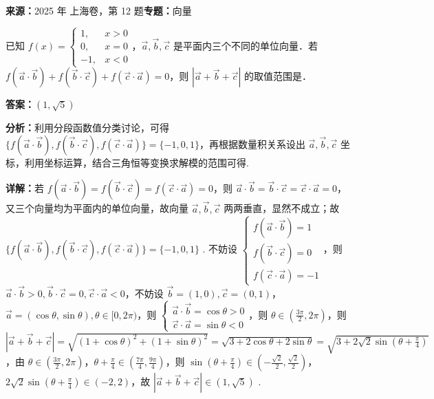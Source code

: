 \begin{question}[points=5]
\textbf{来源：}2025 年 上海卷，第 12 题\quad \textbf{专题：}向量\par
已知 $f(x) = \begin{cases} 1, & x > 0 \\ 0, & x = 0 \\ -1, & x < 0 \end{cases}$，$\vec{a}, \vec{b}, \vec{c}$ 是平面内三个不同的单位向量．若 $f(\vec{a} \cdot \vec{b}) + f(\vec{b} \cdot \vec{c}) + f(\vec{c} \cdot \vec{a}) = 0$，则 $|\vec{a} + \vec{b} + \vec{c}|$ 的取值范围是．
\fillin[{$(1, \sqrt{5})$}]
\begin{solution}
\textbf{答案：}$(1, \sqrt{5})$

\textbf{分析：}利用分段函数值分类讨论，可得 $\{f(\vec{a} \cdot \vec{b}), f(\vec{b} \cdot \vec{c}), f(\vec{c} \cdot \vec{a})\} = \{-1, 0, 1\}$，再根据数量积关系设出 $\vec{a}, \vec{b}, \vec{c}$ 坐标，利用坐标运算，结合三角恒等变换求解模的范围可得.

\textbf{详解：}若 $f(\vec{a} \cdot \vec{b}) = f(\vec{b} \cdot \vec{c}) = f(\vec{c} \cdot \vec{a}) = 0$，则 $\vec{a} \cdot \vec{b} = \vec{b} \cdot \vec{c} = \vec{c} \cdot \vec{a} = 0$，又三个向量均为平面内的单位向量，故向量 $\vec{a}, \vec{b}, \vec{c}$ 两两垂直，显然不成立；故 $\{f(\vec{a} \cdot \vec{b}), f(\vec{b} \cdot \vec{c}), f(\vec{c} \cdot \vec{a})\} = \{-1, 0, 1\}$ . 不妨设 $\begin{cases} f(\vec{a} \cdot \vec{b}) = 1 \\ f(\vec{b} \cdot \vec{c}) = 0 \\ f(\vec{c} \cdot \vec{a}) = -1 \end{cases}$，则 $\vec{a} \cdot \vec{b} > 0, \vec{b} \cdot \vec{c} = 0, \vec{c} \cdot \vec{a} < 0$，不妨设 $\vec{b} = (1,0), \vec{c} = (0,1)$，$\vec{a} = (\cos \theta, \sin \theta), \theta \in [0, 2\pi)$，则 $\begin{cases} \vec{a} \cdot \vec{b} = \cos \theta > 0 \\ \vec{c} \cdot \vec{a} = \sin \theta < 0 \end{cases}$，则 $\theta \in \left(\frac{3\pi}{2}, 2\pi\right)$，则 $|\vec{a} + \vec{b} + \vec{c}| = \sqrt{(1+\cos \theta)^2 + (1+\sin \theta)^2} = \sqrt{3 + 2\cos \theta + 2\sin \theta} = \sqrt{3 + 2\sqrt{2}\sin\left(\theta + \frac{\pi}{4}\right)}$，由 $\theta \in \left(\frac{3\pi}{2}, 2\pi\right)$，$\theta + \frac{\pi}{4} \in \left(\frac{7\pi}{4}, \frac{9\pi}{4}\right)$，则 $\sin\left(\theta + \frac{\pi}{4}\right) \in \left(-\frac{\sqrt{2}}{2}, \frac{\sqrt{2}}{2}\right)$，$2\sqrt{2}\sin\left(\theta + \frac{\pi}{4}\right) \in (-2, 2)$，故 $|\vec{a} + \vec{b} + \vec{c}| \in (1, \sqrt{5})$ .
\end{solution}
\end{question}

